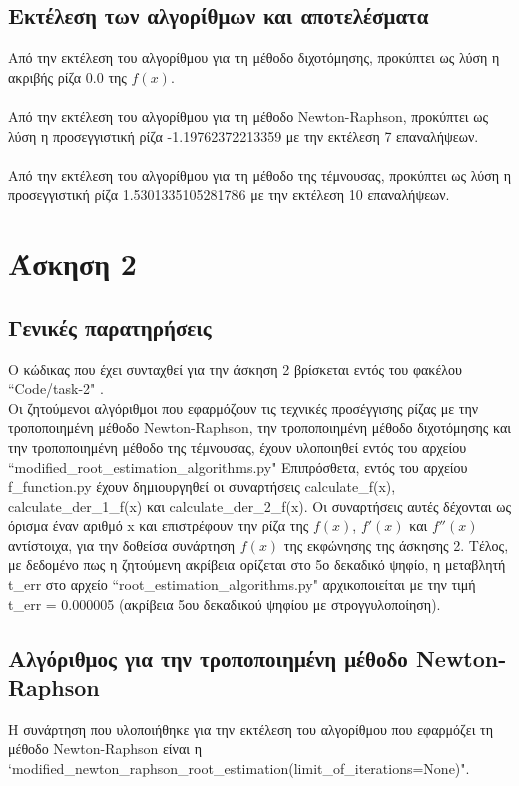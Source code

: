 \documentclass[a4paper,11pt]{article}
\newcommand{\lt}{\latintext}
\begin{document}
\subsection*{Εκτέλεση των αλγορίθμων και αποτελέσματα}
Από την εκτέλεση του αλγορίθμου για τη μέθοδο διχοτόμησης, προκύπτει ως λύση η ακριβής ρίζα 0.0 της {$f(x)$}.\\
\\Από την εκτέλεση του αλγορίθμου για τη μέθοδο {\lt Newton-Raphson}, προκύπτει ως λύση η προσεγγιστική ρίζα -1.19762372213359 με την εκτέλεση 7 επαναλήψεων.\\
\\Από την εκτέλεση του αλγορίθμου για τη μέθοδο της τέμνουσας, προκύπτει ως λύση η προσεγγιστική ρίζα 1.5301335105281786 με την εκτέλεση 10 επαναλήψεων.

\section*{Άσκηση 2}
\subsection*{Γενικές παρατηρήσεις}
Ο κώδικας που έχει συνταχθεί για την άσκηση 2 βρίσκεται εντός του φακέλου {\lt ``Code/task-2" }.\\
Οι ζητούμενοι αλγόριθμοι που εφαρμόζουν τις τεχνικές προσέγγισης ρίζας με την τροποποιημένη μέθοδο {\lt Newton-Raphson}, την τροποποιημένη μέθοδο διχοτόμησης και την τροποποιημένη μέθοδο της τέμνουσας, έχουν 		υλοποιηθεί εντός του αρχείου {\lt ``modified\_root\_estimation\_algorithms.py"}
Επιπρόσθετα, εντός του αρχείου {\lt f\_function.py} έχουν δημιουργηθεί οι συναρτήσεις {\lt calculate\_f(x)}, {\lt calculate\_der\_1\_f(x)} και {\lt calculate\_der\_2\_f(x)}. Οι συναρτήσεις αυτές δέχονται ως όρισμα έναν
αριθμό x και επιστρέφουν την ρίζα της {\lt $f(x)$}, {\lt $f'(x)$} και {\lt $f''(x)$} αντίστοιχα, για την δοθείσα συνάρτηση {\lt $f(x)$} της εκφώνησης της άσκησης 2.
Τέλος, με δεδομένο πως η ζητούμενη ακρίβεια ορίζεται στο 5ο δεκαδικό ψηφίο, η μεταβλητή {\lt t\_err}  στο αρχείο {\lt ``root\_estimation\_algorithms.py"} αρχικοποιείται με την τιμή {\lt t\_err} = 0.000005 (ακρίβεια 5ου 			δεκαδικού ψηφίου με στρογγυλοποίηση).
\subsection*{Αλγόριθμος για την τροποποιημένη μέθοδο {\lt Newton-Raphson }}
Η συνάρτηση που υλοποιήθηκε για την εκτέλεση του αλγορίθμου που εφαρμόζει τη μέθοδο {\lt Newton-Raphson } είναι η {\lt `modified\_newton\_raphson\_root\_estimation(limit\_of\_iterations=None)"}.\\
\end{document}
